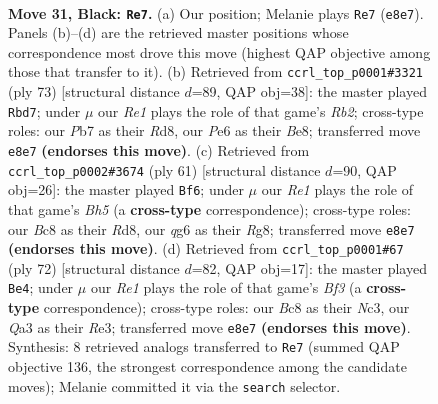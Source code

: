 \documentclass[11pt]{article}
\begin{document}
\clearpage

\begin{figure}[p]\centering
\begin{subfigure}{0.46\textwidth}\centering
\resizebox{\linewidth}{!}{%
\newchessgame
\chessboard[
  setfen={r1b1r3/1p1k1R2/2n1p1Q1/pB2P3/P4P2/q7/4K3/6N1 b - - 0 31},
  showmover=false,
  pgfstyle=straightmove, color=movearrow, markmove={e8-e7}
]}
\caption{}
\end{subfigure}\hfill
\begin{subfigure}{0.46\textwidth}\centering
\resizebox{\linewidth}{!}{%
\newchessgame
\chessboard[
  setfen={3rb1k1/1r3pp1/7p/7P/2Bn1NP1/1P2R1K1/3R4/8 b - - 7 37},
  showmover=false,
  pgfstyle=straightmove, color=movearrow, markmove={b7-d7}
]}
\caption{}
\end{subfigure}
\\[4pt]
\begin{subfigure}{0.46\textwidth}\centering
\resizebox{\linewidth}{!}{%
\newchessgame
\chessboard[
  setfen={3rk1r1/3n3p/P3p3/1Q1b4/7b/5Pp1/1P1B2P1/2R3K1 b - - 0 31},
  showmover=false,
  pgfstyle=straightmove, color=movearrow, markmove={h4-f6}
]}
\caption{}
\end{subfigure}\hfill
\begin{subfigure}{0.46\textwidth}\centering
\resizebox{\linewidth}{!}{%
\newchessgame
\chessboard[
  setfen={4r1k1/1n6/1n1pN1p1/3P3p/2p2P2/2N1RBPb/5K2/8 w - - 0 37},
  showmover=false,
  pgfstyle=straightmove, color=movearrow, markmove={f3-e4}
]}
\caption{}
\end{subfigure}
\caption{\textbf{Move 31, Black: \texttt{Re7}.} (a) Our position; Melanie plays \texttt{Re7} (\texttt{e8e7}). Panels (b)--(d) are the retrieved master positions whose correspondence most drove this move (highest QAP objective among those that transfer to it). (b) Retrieved from \texttt{ccrl\_top\_p0001\#3321} (ply 73) [structural distance $d$=89, QAP obj=38]: the master played \texttt{Rbd7}; under $\mu$ our \emph{Re1} plays the role of that game's \emph{Rb2}; cross-type roles: our \emph{P}b7 as their \emph{R}d8, our \emph{P}e6 as their \emph{B}e8; transferred move \texttt{e8e7} \textbf{(endorses this move)}. (c) Retrieved from \texttt{ccrl\_top\_p0002\#3674} (ply 61) [structural distance $d$=90, QAP obj=26]: the master played \texttt{Bf6}; under $\mu$ our \emph{Re1} plays the role of that game's \emph{Bh5} (a \textbf{cross-type} correspondence); cross-type roles: our \emph{B}c8 as their \emph{R}d8, our \emph{q}g6 as their \emph{R}g8; transferred move \texttt{e8e7} \textbf{(endorses this move)}. (d) Retrieved from \texttt{ccrl\_top\_p0001\#67} (ply 72) [structural distance $d$=82, QAP obj=17]: the master played \texttt{Be4}; under $\mu$ our \emph{Re1} plays the role of that game's \emph{Bf3} (a \textbf{cross-type} correspondence); cross-type roles: our \emph{B}c8 as their \emph{N}c3, our \emph{Q}a3 as their \emph{R}e3; transferred move \texttt{e8e7} \textbf{(endorses this move)}. Synthesis: 8 retrieved analogs transferred to \texttt{Re7} (summed QAP objective 136, the strongest correspondence among the candidate moves); Melanie committed it via the \texttt{search} selector.}
\label{fig:thought-m61}
\end{figure}
\end{document}
